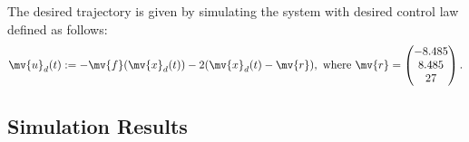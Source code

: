 \begin{frame}{\insertsubsectionhead}{}
  The desired trajectory is given by simulating the system with desired control law defined as follows:
  \begin{equation}
    \mv{u}_d(t)
    :=
    -\mv{f}(\mv{x}_d(t))
    -2(\mv{x}_d(t)-\mv{r})
    ,
    \text{ where }
    \mv{r} =
    \begin{pmatrix}
      -8.485\\8.485\\27
    \end{pmatrix}
    .
  \end{equation}

\end{frame}

\subsection{Simulation Results}

